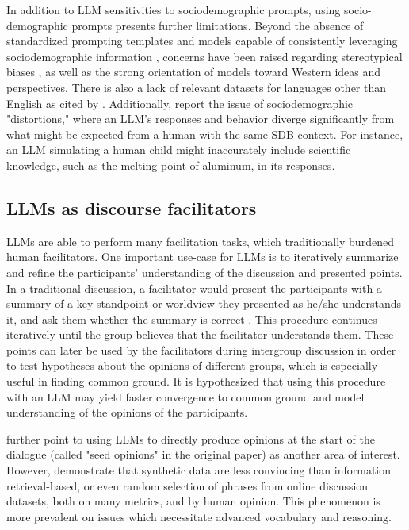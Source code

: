 In addition to LLM sensitivities to sociodemographic prompts, using socio-demographic prompts presents further limitations. Beyond the absence of standardized prompting templates and models capable of consistently leveraging sociodemographic information \cite{beck-etal-2024-sensitivity}, concerns have been raised regarding stereotypical biases \cite{cheng-etal-2023-marked, deshpande-etal-2023-toxicity}, as well as the strong orientation of models toward Western ideas and perspectives. There is also a lack of relevant datasets for languages other than English \cite{pmlr-v202-santurkar23a, durmus2024measuringrepresentationsubjectiveglobal, santy-etal-2023-nlpositionality} as cited by \citet{beck-etal-2024-sensitivity}. Additionally, \citet{aher2023usinglargelanguagemodels} report the issue of sociodemographic "distortions," where an LLM’s responses and behavior diverge significantly from what might be expected from a human with the same \ac{SDB} context. For instance, an LLM simulating a human child might inaccurately include scientific knowledge, such as the melting point of aluminum, in its responses.


\subsection{LLMs as discourse facilitators}
\label{sec:related:discource}


LLMs are able to perform many facilitation tasks, which traditionally burdened human facilitators. One important use-case for LLMs is to iteratively summarize and refine the participants' understanding of the discussion and presented points. In a traditional discussion, a facilitator would present the participants with a summary of a key standpoint or worldview they presented as he/she understands it, and ask them whether the summary is correct \cite{small-polis-llm, Tsai2024Generative}. This procedure continues iteratively until the group believes that the facilitator understands them. These points can later be used by the facilitators during intergroup discussion in order to test hypotheses about the opinions of different groups, which is especially useful in finding common ground. It is hypothesized \cite{small-polis-llm} that using this procedure with an LLM may yield faster convergence to common ground and model understanding of the opinions of the participants.

\citet{small-polis-llm} further point to using LLMs to directly produce opinions at the start of the dialogue (called "seed opinions" in the original paper) as another area of interest. However, \citet{karadzhov2023delidata} demonstrate that synthetic data are less convincing than information retrieval-based, or even random selection of phrases from online discussion datasets, both on many metrics, and by human opinion. This phenomenon is more prevalent on issues which necessitate advanced vocabulary and reasoning.

